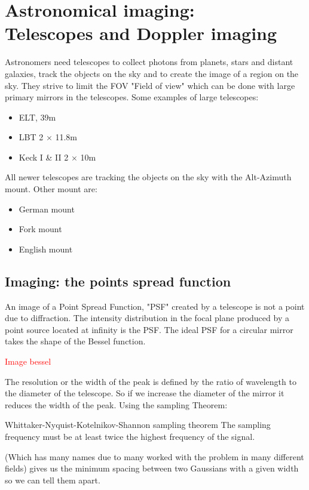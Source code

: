 \section{Astronomical imaging: \\ Telescopes and Doppler imaging}
Astronomers need telescopes to collect photons from planets, stars and distant galaxies, track the objects on the sky and to create the image of a region on the sky. They strive to limit the FOV "Field of view" which can be done with large primary mirrors in the telescopes. Some examples of large telescopes:

\begin{itemize}
	\item ELT, 39m 
	\item LBT 2 $\times$ 11.8m
	\item Keck I \& II 2 $\times$ 10m 
\end{itemize}

All newer telescopes are tracking the objects on the sky with the Alt-Azimuth mount. Other mount are: 
\begin{itemize}
	\item German mount
	\item Fork mount
	\item English mount
\end{itemize}

	\subsection{Imaging: the points spread function}
	An image of a Point Spread Function, "PSF" created by a telescope is not a point due to diffraction. The intensity distribution in the focal plane produced by a point source located at infinity is the PSF. The ideal PSF for a circular mirror takes the shape of the Bessel function.

	\textcolor{red}{Image bessel} 

	The resolution or the width of the peak is defined by the ratio of wavelength to the diameter of the telescope. So if we increase the diameter of the mirror it reduces the width of the peak. Using the sampling Theorem: 

		\begin{wbox}{Whittaker-Nyquist-Kotelnikov-Shannon sampling theorem}
			The sampling frequency must be at least twice the highest frequency of the signal.
		\end{wbox}	 

	 (Which has many names due to many worked with the problem in many different fields) gives us the minimum spacing between two Gaussians with a given width so we can tell them apart.

